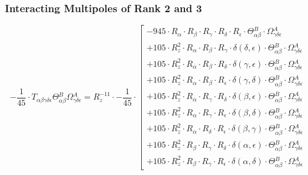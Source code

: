 \documentclass{article}
\begin{document}
\subsubsection{Interacting Multipoles of Rank 2 and 3}
\begin{equation}
- \frac{1}{45} \cdot T_{\alpha{}\beta{}\gamma{}\delta{}\epsilon{}} \Theta{}^{B}_{\alpha{}\beta{}} \Omega{}^{A}_{\gamma{}\delta{}\epsilon{}} = R_{z}^{-11} \cdot - \frac{1}{45} \cdot  \left[ \begin{array}{c} 
 		- 945 \cdot R_{\alpha{}} \cdot R_{\beta{}} \cdot R_{\gamma{}} \cdot R_{\delta{}} \cdot R_{\epsilon{}} \cdot \Theta{}^{B}_{\alpha{}\beta{}} \cdot \Omega{}^{A}_{\gamma{}\delta{}\epsilon{}} 
 \\[0.2em] 		 + 105 \cdot R_{z}^{2} \cdot R_{\alpha{}} \cdot R_{\beta{}} \cdot R_{\gamma{}} \cdot \delta{}\left(\delta{}, \epsilon{}\right) \cdot \Theta{}^{B}_{\alpha{}\beta{}} \cdot \Omega{}^{A}_{\gamma{}\delta{}\epsilon{}} 
 \\[0.2em] 		 + 105 \cdot R_{z}^{2} \cdot R_{\alpha{}} \cdot R_{\beta{}} \cdot R_{\delta{}} \cdot \delta{}\left(\gamma{}, \epsilon{}\right) \cdot \Theta{}^{B}_{\alpha{}\beta{}} \cdot \Omega{}^{A}_{\gamma{}\delta{}\epsilon{}} 
 \\[0.2em] 		 + 105 \cdot R_{z}^{2} \cdot R_{\alpha{}} \cdot R_{\beta{}} \cdot R_{\epsilon{}} \cdot \delta{}\left(\gamma{}, \delta{}\right) \cdot \Theta{}^{B}_{\alpha{}\beta{}} \cdot \Omega{}^{A}_{\gamma{}\delta{}\epsilon{}} 
 \\[0.2em] 		 + 105 \cdot R_{z}^{2} \cdot R_{\alpha{}} \cdot R_{\gamma{}} \cdot R_{\delta{}} \cdot \delta{}\left(\beta{}, \epsilon{}\right) \cdot \Theta{}^{B}_{\alpha{}\beta{}} \cdot \Omega{}^{A}_{\gamma{}\delta{}\epsilon{}} 
 \\[0.2em] 		 + 105 \cdot R_{z}^{2} \cdot R_{\alpha{}} \cdot R_{\gamma{}} \cdot R_{\epsilon{}} \cdot \delta{}\left(\beta{}, \delta{}\right) \cdot \Theta{}^{B}_{\alpha{}\beta{}} \cdot \Omega{}^{A}_{\gamma{}\delta{}\epsilon{}} 
 \\[0.2em] 		 + 105 \cdot R_{z}^{2} \cdot R_{\alpha{}} \cdot R_{\delta{}} \cdot R_{\epsilon{}} \cdot \delta{}\left(\beta{}, \gamma{}\right) \cdot \Theta{}^{B}_{\alpha{}\beta{}} \cdot \Omega{}^{A}_{\gamma{}\delta{}\epsilon{}} 
 \\[0.2em] 		 + 105 \cdot R_{z}^{2} \cdot R_{\beta{}} \cdot R_{\gamma{}} \cdot R_{\delta{}} \cdot \delta{}\left(\alpha{}, \epsilon{}\right) \cdot \Theta{}^{B}_{\alpha{}\beta{}} \cdot \Omega{}^{A}_{\gamma{}\delta{}\epsilon{}} 
 \\[0.2em] 		 + 105 \cdot R_{z}^{2} \cdot R_{\beta{}} \cdot R_{\gamma{}} \cdot R_{\epsilon{}} \cdot \delta{}\left(\alpha{}, \delta{}\right) \cdot \Theta{}^{B}_{\alpha{}\beta{}} \cdot \Omega{}^{A}_{\gamma{}\delta{}\epsilon{}} 

\end{array}
\end{equation}
\end{document}
